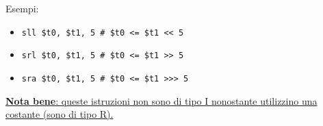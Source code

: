 \documentclass[../main.tex]{subfiles}
\begin{document}
\noindent
Esempi:
\begin{itemize}
    \item \texttt{sll \$t0, \$t1, 5  \hspace*{0cm} \hspace*{0cm} \# \$t0 <= \$t1 << 5}
    \item \texttt{srl \$t0, \$t1, 5  \hspace*{0cm} \hspace*{0cm} \# \$t0 <= \$t1 >> 5}
    \item \texttt{sra \$t0, \$t1, 5  \hspace*{0cm} \hspace*{0cm} \# \$t0 <= \$t1 >>> 5}
\end{itemize}

\vspace*{5mm}

\noindent
\underline{\textbf{Nota bene}: queste istruzioni non sono di tipo I
nonostante utilizzino una costante (sono di tipo R).}
\end{document}
